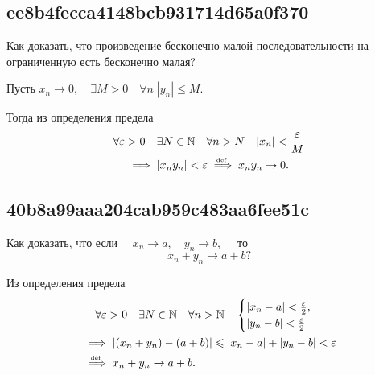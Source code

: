 \documentclass[11pt, a5paper]{article}
\newenvironment{note}[1]{\goodbreak\par\subsection{\hfill \color{lightgray}\tiny #1}}{}
\newenvironment{cloze}[2][\ldots]{\begin{leftbar}}{\end{leftbar}}
\begin{document}
    \begin{note}{ee8b4fecca4148bcb931714d65a0f370}
        Как доказать, что произведение бесконечно малой последовательности на
        ограниченную есть бесконечно малая?

        \begin{cloze}{1}
            Пусть \( x_n \to 0, \quad \exists M > 0 \quad \forall n\; |y_n| \leqslant M. \)

            Тогда из определения предела \begin{multline*}
                \forall \varepsilon > 0 \quad \exists N \in \mathbb N \quad
                \forall n > N \quad |x_n| < \frac{\varepsilon}{M} \\
                \implies |x_n y_n| < \varepsilon \overset{\!\!\text{\tiny def}}\implies  x_n y_n \to 0.
            \end{multline*}
        \end{cloze}
    \end{note}

    \begin{note}{40b8a99aaa204cab959c483aa6fee51c}
        Как доказать, что если \( \quad x_n \to a, \quad y_n \to b, \quad \) то \[
            x_n + y_n \to a + b?
        \]

        \begin{cloze}{1}
            Из определения предела \[
                \begin{gathered}
                    \forall \varepsilon > 0 \quad \exists N \in \mathbb N \quad \forall n > \mathbb N \quad \begin{cases}
                        |x_n - a| < \frac{\varepsilon}{2}, \\
                        |y_n - b| < \frac{\varepsilon}{2}
                    \end{cases} \\
                    \begin{aligned}
                        &\implies |(x_n + y_n) - (a + b)| \leqslant |x_n - a| + |y_n - b| < \varepsilon \\
                        &\overset{\!\!\text{\tiny def}}\implies x_n + y_n \to a + b.
                    \end{aligned}
                \end{gathered}
            \]
        \end{cloze}
    \end{note}
\end{document}

